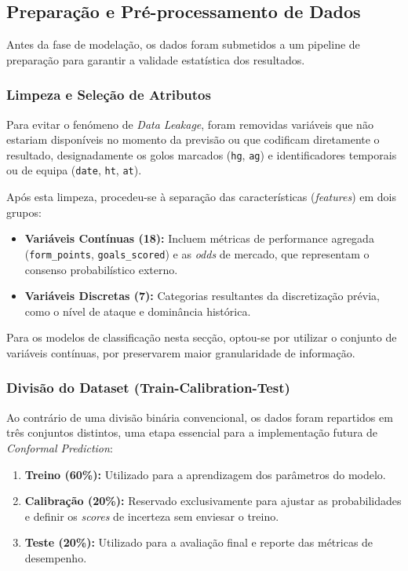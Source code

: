 \documentclass[10pt]{article}
\begin{document}
\subsection{Preparação e Pré-processamento de Dados}

Antes da fase de modelação, os dados foram submetidos a um pipeline de preparação para garantir a validade estatística dos resultados.

\subsubsection{Limpeza e Seleção de Atributos}
Para evitar o fenómeno de \textit{Data Leakage}, foram removidas variáveis que não estariam disponíveis no momento da previsão ou que codificam diretamente o resultado, designadamente os golos marcados (\texttt{hg}, \texttt{ag}) e identificadores temporais ou de equipa (\texttt{date}, \texttt{ht}, \texttt{at}). 

Após esta limpeza, procedeu-se à separação das características (\textit{features}) em dois grupos:
\begin{itemize}
    \item \textbf{Variáveis Contínuas (18):} Incluem métricas de performance agregada (\texttt{form\_points}, \texttt{goals\_scored}) e as \textit{odds} de mercado, que representam o consenso probabilístico externo.
    \item \textbf{Variáveis Discretas (7):} Categorias resultantes da discretização prévia, como o nível de ataque e dominância histórica.
\end{itemize}
Para os modelos de classificação nesta secção, optou-se por utilizar o conjunto de variáveis contínuas, por preservarem maior granularidade de informação.

\subsubsection{Divisão do Dataset (Train-Calibration-Test)}
Ao contrário de uma divisão binária convencional, os dados foram repartidos em três conjuntos distintos, uma etapa essencial para a implementação futura de \textit{Conformal Prediction}:
\begin{enumerate}
    \item \textbf{Treino (60\%):} Utilizado para a aprendizagem dos parâmetros do modelo.
    \item \textbf{Calibração (20\%):} Reservado exclusivamente para ajustar as probabilidades e definir os \textit{scores} de incerteza sem enviesar o treino.
    \item \textbf{Teste (20\%):} Utilizado para a avaliação final e reporte das métricas de desempenho.
\end{enumerate}
\end{document}
